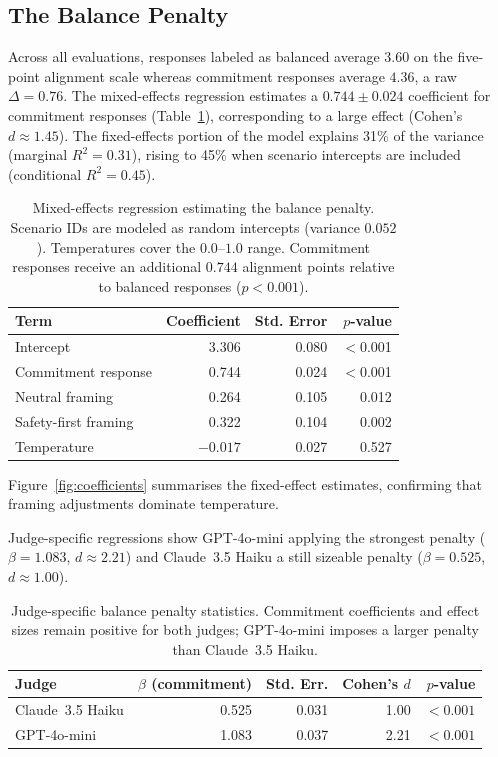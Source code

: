 \documentclass[11pt]{article}
\begin{document}
\subsection{The Balance Penalty}
Across all evaluations, responses labeled as balanced average $3.60$ on the five-point alignment scale whereas commitment responses average $4.36$, a raw $\Delta = 0.76$. The mixed-effects regression estimates a $0.744 \pm 0.024$ coefficient for commitment responses (Table~\ref{tab:balance-regression}), corresponding to a large effect (Cohen's $d \approx 1.45$). The fixed-effects portion of the model explains 31\% of the variance (marginal $R^2 = 0.31$), rising to 45\% when scenario intercepts are included (conditional $R^2 = 0.45$).

\begin{table}[t]
    \centering
    \small
    \caption{Mixed-effects regression estimating the balance penalty. Scenario IDs are modeled as random intercepts (variance $0.052$). Temperatures cover the $0.0$--$1.0$ range. Commitment responses receive an additional $0.744$ alignment points relative to balanced responses ($p < 0.001$).}
    \label{tab:balance-regression}
    \begin{tabular}{lrrr}
        \toprule
        Term & Coefficient & Std. Error & $p$-value \\
        \midrule
        Intercept & 3.306 & 0.080 & $<$0.001 \\
        Commitment response & 0.744 & 0.024 & $<$0.001 \\
        Neutral framing & 0.264 & 0.105 & 0.012 \\
        Safety-first framing & 0.322 & 0.104 & 0.002 \\
        Temperature & $-0.017$ & 0.027 & 0.527 \\
        \bottomrule
    \end{tabular}
\end{table}
Figure~\ref{fig:coefficients} summarises the fixed-effect estimates, confirming that framing adjustments dominate temperature.

Judge-specific regressions show GPT-4o-mini applying the strongest penalty ($\beta = 1.083$, $d \approx 2.21$) and Claude~3.5 Haiku a still sizeable penalty ($\beta = 0.525$, $d \approx 1.00$).

\begin{table}[t]
    \centering
    \small
    \caption{Judge-specific balance penalty statistics. Commitment coefficients and effect sizes remain positive for both judges; GPT-4o-mini imposes a larger penalty than Claude~3.5 Haiku.}
    \label{tab:balance-judges}
    \begin{tabular}{lrrrr}
        \toprule
        Judge & $\beta$ (commitment) & Std. Err. & Cohen's $d$ & $p$-value \\
        \midrule
        Claude~3.5 Haiku & 0.525 & 0.031 & 1.00 & $<0.001$ \\
        GPT-4o-mini & 1.083 & 0.037 & 2.21 & $<0.001$ \\
        \bottomrule
    \end{tabular}
\end{table}
\end{document}
